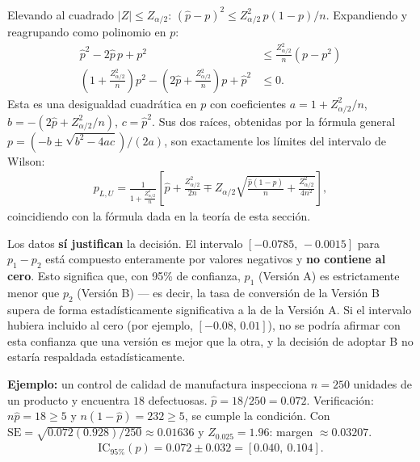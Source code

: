 \begin{solproblema}[prob:2bf037d]
	Elevando al cuadrado $|Z|\le Z_{\alpha/2}$: $(\hat p-p)^2 \le Z_{\alpha/2}^2\,p(1-p)/n$. Expandiendo y reagrupando como polinomio en $p$:
	\begin{align*}
		\hat p^2 - 2\hat p\,p + p^2 &\le \frac{Z_{\alpha/2}^2}{n}(p-p^2) \\
		\left(1+\frac{Z_{\alpha/2}^2}{n}\right)p^2 - \left(2\hat p+\frac{Z_{\alpha/2}^2}{n}\right)p + \hat p^2 &\le 0.
	\end{align*}
	Esta es una desigualdad cuadrática en $p$ con coeficientes $a=1+Z_{\alpha/2}^2/n$, $b=-(2\hat p+Z_{\alpha/2}^2/n)$, $c=\hat p^2$. Sus dos raíces, obtenidas por la fórmula general $p=(-b\pm\sqrt{b^2-4ac})/(2a)$, son exactamente los límites del intervalo de Wilson:
	\begin{align*}
		p_{L,U} = \frac{1}{1+\frac{Z_{\alpha/2}^2}{n}}\left[\hat p+\frac{Z_{\alpha/2}^2}{2n} \mp Z_{\alpha/2}\sqrt{\frac{\hat p(1-\hat p)}{n}+\frac{Z_{\alpha/2}^2}{4n^2}}\right],
	\end{align*}
	coincidiendo con la fórmula dada en la teoría de esta sección.
\end{solproblema}

\begin{solproblema}[prob:816285e]
	Los datos \textbf{sí justifican} la decisión. El intervalo $[-0.0785,\,-0.0015]$ para $p_1-p_2$ está compuesto enteramente por valores negativos y \textbf{no contiene al cero}. Esto significa que, con 95\% de confianza, $p_1$ (Versión A) es estrictamente menor que $p_2$ (Versión B) — es decir, la tasa de conversión de la Versión B supera de forma estadísticamente significativa a la de la Versión A. Si el intervalo hubiera incluido al cero (por ejemplo, $[-0.08,\,0.01]$), no se podría afirmar con esta confianza que una versión es mejor que la otra, y la decisión de adoptar B no estaría respaldada estadísticamente.
\end{solproblema}

\begin{solproblema}[prob:e10df82]
	\textbf{Ejemplo:} un control de calidad de manufactura inspecciona $n=250$ unidades de un producto y encuentra $18$ defectuosas. $\hat p = 18/250 = 0.072$. Verificación: $n\hat p = 18\ge5$ y $n(1-\hat p)=232\ge5$, se cumple la condición. Con $\text{SE}=\sqrt{0.072(0.928)/250}\approx0.01636$ y $Z_{0.025}=1.96$: margen $\approx0.03207$.
	\begin{align*}
		\text{IC}_{95\%}(p) = 0.072\pm0.032 = [0.040,\ 0.104].
	\end{align*}
\end{solproblema}
